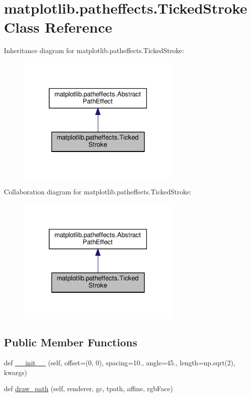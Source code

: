 \hypertarget{classmatplotlib_1_1patheffects_1_1TickedStroke}{}\section{matplotlib.\+patheffects.\+Ticked\+Stroke Class Reference}
\label{classmatplotlib_1_1patheffects_1_1TickedStroke}


Inheritance diagram for matplotlib.\+patheffects.\+Ticked\+Stroke\+:
\nopagebreak
\begin{figure}[H]
\begin{center}
\leavevmode
\includegraphics[width=230pt]{classmatplotlib_1_1patheffects_1_1TickedStroke__inherit__graph}
\end{center}
\end{figure}


Collaboration diagram for matplotlib.\+patheffects.\+Ticked\+Stroke\+:
\nopagebreak
\begin{figure}[H]
\begin{center}
\leavevmode
\includegraphics[width=230pt]{classmatplotlib_1_1patheffects_1_1TickedStroke__coll__graph}
\end{center}
\end{figure}
\subsection*{Public Member Functions}
\begin{DoxyCompactItemize}
\item 
def \hyperlink{classmatplotlib_1_1patheffects_1_1TickedStroke_aa306391297e13180c8df34f4b4c97fad}{\+\_\+\+\_\+init\+\_\+\+\_\+} (self, offset=(0, 0), spacing=10., angle=45., length=np.\+sqrt(2), kwargs)
\item 
def \hyperlink{classmatplotlib_1_1patheffects_1_1TickedStroke_ad2aedb41ade5de1d45ab82b6e2e445f2}{draw\+\_\+path} (self, renderer, gc, tpath, affine, rgb\+Face)
\end{DoxyCompactItemize}


